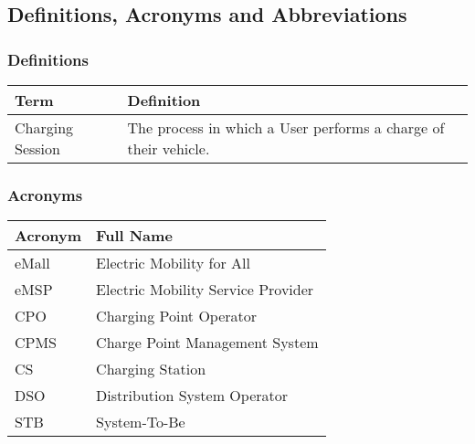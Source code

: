 \documentclass[12pt]{article}
\begin{document}
\subsection{Definitions, Acronyms and Abbreviations}

\subsubsection{Definitions}

\begin{table}[H]
    \centering
    \setlength{\tabcolsep}{18pt}
    \renewcommand{\arraystretch}{1.2}
    \begin{tabularx}{\textwidth}{|>{\centering\hsize=0.3\hsize}X|>{\hsize=1.7\hsize}X|}
        \hline
        \textbf{Term} & \textbf{Definition} \\
        \hline
        Charging Session & The process in which a User performs a charge of their vehicle. \\
        \hline
    \end{tabularx}
    \label{tab:definitions}
\end{table}

\subsubsection{Acronyms}

\begin{table}[H]
    \centering
    \setlength{\tabcolsep}{18pt}
    \renewcommand{\arraystretch}{1.2}
    \begin{tabularx}{\textwidth}{|>{\centering\hsize=0.3\hsize}X|>{\hsize=1.7\hsize}X|}
        \hline
        \textbf{Acronym} & \textbf{Full Name} \\
        \hline
        eMall & Electric Mobility for All \\
        \hline
        eMSP & Electric Mobility Service Provider \\
        \hline
        CPO & Charging Point Operator \\
        \hline
        CPMS & Charge Point Management System \\
        \hline
        CS & Charging Station \\
        \hline
        DSO & Distribution System Operator \\
        \hline
        STB & System-To-Be \\
        \hline
    \end{tabularx}
    \label{tab:acronyms}
\end{table}
\end{document}
